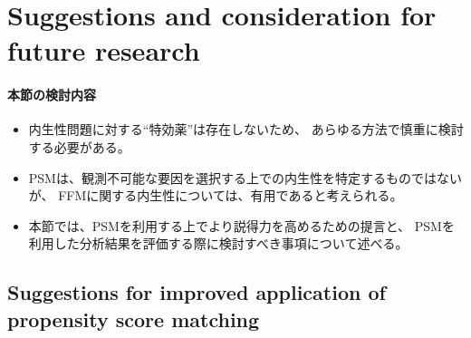 \section{Suggestions and consideration for future research}
\paragraph{本節の検討内容}
\begin{itemize}
 \item 内生性問題に対する``特効薬''は存在しないため、
       あらゆる方法で慎重に検討する必要がある。
 \item PSMは、観測不可能な要因を選択する上での内生性を特定するものではないが、
       FFMに関する内生性については、有用であると考えられる。
 \item 本節では、PSMを利用する上でより説得力を高めるための提言と、
       PSMを利用した分析結果を評価する際に検討すべき事項について述べる。
\end{itemize}

\subsection{Suggestions for improved application of propensity score matching}

